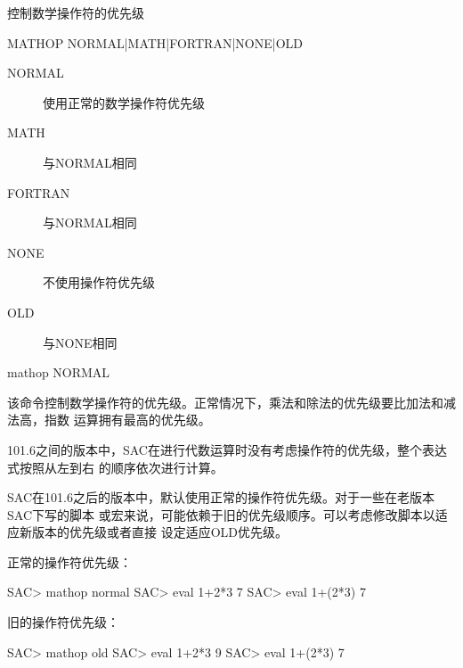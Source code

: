 \label{cmd:mathop}

控制数学操作符的优先级

\begin{SACSTX}
MATHOP NORMAL|MATH|FORTRAN|NONE|OLD
\end{SACSTX}

\begin{description}
\item [NORMAL] 使用正常的数学操作符优先级
\item [MATH] 与NORMAL相同
\item [FORTRAN] 与NORMAL相同
\item [NONE] 不使用操作符优先级
\item [OLD] 与NONE相同
\end{description}

\begin{SACDFT}
mathop NORMAL
\end{SACDFT}

该命令控制数学操作符的优先级。正常情况下，乘法和除法的优先级要比加法和减法高，指数
运算拥有最高的优先级。

101.6之间的版本中，SAC在进行代数运算时没有考虑操作符的优先级，整个表达式按照从左到右
的顺序依次进行计算。

SAC在101.6之后的版本中，默认使用正常的操作符优先级。对于一些在老版本SAC下写的脚本
或宏来说，可能依赖于旧的优先级顺序。可以考虑修改脚本以适应新版本的优先级或者直接
设定适应OLD优先级。

正常的操作符优先级：
\begin{SACCode}
SAC> mathop normal
SAC> eval 1+2*3
 7
SAC> eval 1+(2*3)
 7
\end{SACCode}

旧的操作符优先级：
\begin{SACCode}
SAC> mathop old
SAC> eval 1+2*3
 9
SAC> eval 1+(2*3)
 7
\end{SACCode}
